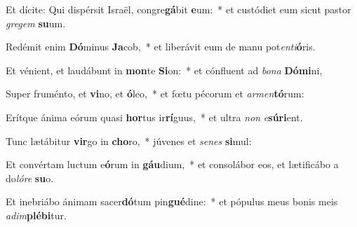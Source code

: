 \item Et dícite: Qui dispérsit Israël, congre\textbf{gá}bit \textbf{e}um:~* et custódiet eum sicut pastor \textit{gre}\textit{gem} \textbf{su}um.
\item Redémit enim \textbf{Dó}minus \textbf{Ja}cob,~* et liberávit eum de manu pot\textit{en}\textit{ti}\textbf{ó}ris.
\item Et vénient, et laudábunt in \textbf{mon}te \textbf{Si}on:~* et cónfluent ad \textit{bo}\textit{na} \textbf{Dó}\textbf{mi}ni,
\item Super fruménto, et \textbf{vi}no, et \textbf{ó}leo,~* et fœtu pécorum et \textit{ar}\textit{men}\textbf{tó}rum:
\item Erítque ánima eórum quasi \textbf{hor}tus ir\textbf{rí}guus,~* et ultra \textit{non} \textit{e}\textbf{sú}\textbf{ri}ent.
\item Tunc lætábitur \textbf{vir}go in \textbf{cho}ro,~* júvenes et \textit{se}\textit{nes} \textbf{si}mul:
\item Et convértam luctum e\textbf{ó}rum in \textbf{gáu}dium,~* et consolábor eos, et lætificábo a do\textit{ló}\textit{re} \textbf{su}o.
\item Et inebriábo ánimam sacer\textbf{dó}tum pin\textbf{gué}dine:~* et pópulus meus bonis meis \textit{ad}\textit{im}\textbf{plé}\textbf{bi}tur.
